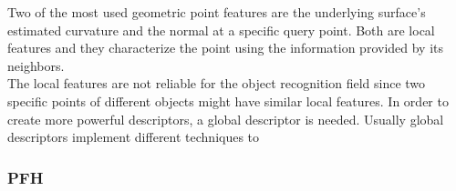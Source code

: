 Two of the most used geometric point features are the underlying surface's estimated curvature and the normal at a specific query point. Both are local features and they characterize the point using the information provided by its neighbors. \\

The local features are not reliable for the object recognition field since two specific points of different objects might have similar local features. In order to create more powerful descriptors, a global descriptor is needed. Usually global descriptors implement different techniques to 


\subsubsection{PFH}
\label{pfh}
